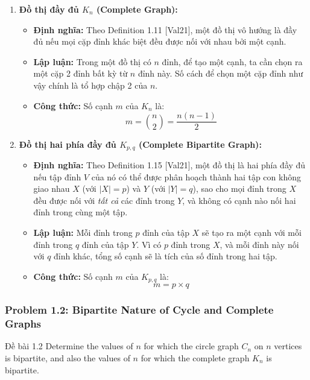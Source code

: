 \documentclass[a4paper,12pt]{article}
\begin{document}
\begin{enumerate}
    \item \textbf{Đồ thị đầy đủ $K_n$ (Complete Graph):}
    \begin{itemize}
        \item \textbf{Định nghĩa:} Theo Definition 1.11 [Val21], một đồ thị vô hướng là đầy đủ nếu mọi cặp đỉnh khác biệt đều được nối với nhau bởi một cạnh.
        \item \textbf{Lập luận:} Trong một đồ thị có $n$ đỉnh, để tạo một cạnh, ta cần chọn ra một cặp 2 đỉnh bất kỳ từ $n$ đỉnh này. Số cách để chọn một cặp đỉnh như vậy chính là tổ hợp chập 2 của $n$.
        \item \textbf{Công thức:} Số cạnh $m$ của $K_n$ là:
        \[ m = \binom{n}{2} = \frac{n(n-1)}{2} \]
    \end{itemize}
    
    \item \textbf{Đồ thị hai phía đầy đủ $K_{p,q}$ (Complete Bipartite Graph):}
    \begin{itemize}
        \item \textbf{Định nghĩa:} Theo Definition 1.15 [Val21], một đồ thị là hai phía đầy đủ nếu tập đỉnh $V$ của nó có thể được phân hoạch thành hai tập con không giao nhau $X$ (với $|X|=p$) và $Y$ (với $|Y|=q$), sao cho mọi đỉnh trong $X$ đều được nối với \textit{tất cả} các đỉnh trong $Y$, và không có cạnh nào nối hai đỉnh trong cùng một tập.
        \item \textbf{Lập luận:} Mỗi đỉnh trong $p$ đỉnh của tập $X$ sẽ tạo ra một cạnh với mỗi đỉnh trong $q$ đỉnh của tập $Y$. Vì có $p$ đỉnh trong $X$, và mỗi đỉnh này nối với $q$ đỉnh khác, tổng số cạnh sẽ là tích của số đỉnh trong hai tập.
        \item \textbf{Công thức:} Số cạnh $m$ của $K_{p,q}$ là:
        \[ m = p \times q \]
    \end{itemize}
\end{enumerate}

\subsubsection{Problem 1.2: Bipartite Nature of Cycle and Complete Graphs}
\begin{problembox}{Đề bài 1.2}
    Determine the values of $n$ for which the circle graph $C_n$ on $n$ vertices is bipartite, and also the values of $n$ for which the complete graph $K_n$ is bipartite.
\end{problembox}
\end{document}
